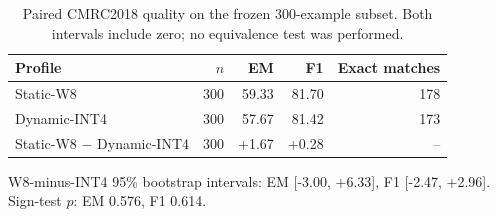\begin{table}[H]
\centering
\small
\setlength{\tabcolsep}{4pt}
\begin{tabular}{@{}lrrrr@{}}
\toprule
Profile & $n$ & EM & F1 & Exact matches \\
\midrule
Static-W8 & 300 & 59.33 & 81.70 & 178 \\
Dynamic-INT4 & 300 & 57.67 & 81.42 & 173 \\
Static-W8 $-$ Dynamic-INT4 & 300 & +1.67 & +0.28 & -- \\
\bottomrule
\end{tabular}
\vspace{3pt}\par\footnotesize W8-minus-INT4 95\% bootstrap intervals: EM [-3.00, +6.33], F1 [-2.47, +2.96]. Sign-test $p$: EM 0.576, F1 0.614.
\caption{Paired CMRC2018 quality on the frozen 300-example subset. Both intervals include zero; no equivalence test was performed. }
\label{tab:paired-quality}
\end{table}
